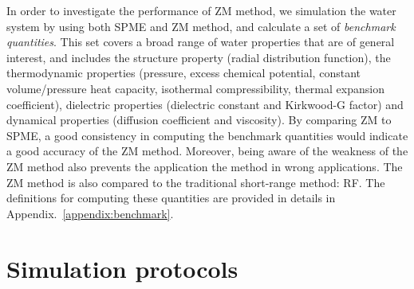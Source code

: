 \documentclass[aip,jcp,a4paper,preprint,unsortedaddress,onecolumn,fleqn]{revtex4-1}
\begin{document}
In order to investigate the performance of ZM method, we simulation
the water system by using both SPME and ZM method, and calculate a set
of \emph{benchmark quantities}.  This set covers a broad range of
water properties that are of general interest, and includes the
structure property (radial distribution function), the thermodynamic
properties (pressure, excess chemical potential, constant
volume/pressure heat capacity, isothermal compressibility, thermal
expansion coefficient), dielectric properties (dielectric constant and
Kirkwood-G factor) and dynamical properties (diffusion coefficient and
viscosity).  By comparing ZM to SPME, a good consistency in computing
the benchmark quantities would indicate a good accuracy of the ZM
method.  Moreover, being aware of the weakness of the ZM method also
prevents the application the method in wrong applications.  The ZM
method is also compared to the traditional short-range method: RF.
The definitions for computing these quantities are provided in details
in Appendix.~\ref{appendix:benchmark}.


\section{Simulation protocols}
\end{document}
